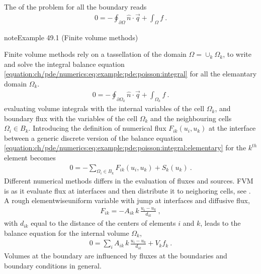 \documentclass[letterpaper,10pt,english]{jupyterBook}
\begin{document}
\sphinxAtStartPar
The  of the problem for all the boundary reads
\begin{equation}\label{equation:ch/pde/numerics:eq:example:pde:poisson:integral}
\begin{split}0 = - \oint_{\partial \Omega} \hat{n} \cdot \vec{q} + \int_{\Omega} f \ .\end{split}
\end{equation}\label{ch/pde/numerics:pde:ex:fvm}
\begin{sphinxadmonition}{note}{Example 49.1 (Finite volume methods)}



\sphinxAtStartPar
Finite volume methods rely on a tassellation of the domain \(\Omega = \cup_k \Omega_k\), to write and solve the integral balance equation \eqref{equation:ch/pde/numerics:eq:example:pde:poisson:integral} for all the elemantary domain \(\Omega_k\).
\begin{equation}\label{equation:ch/pde/numerics:eq:example:pde:poisson:integral:elementary}
\begin{split}0 = - \oint_{\partial \Omega_k} \hat{n} \cdot \vec{q} + \int_{\Omega_k} f \ .\end{split}
\end{equation}
\sphinxAtStartPar
evaluating volume integrals with the internal variables of the cell \(\Omega_k\), and boundary flux with the variables of the cell \(\Omega_k\) and the neighbouring cells \(\Omega_i \in B_k\). Introducing the definition of numerical flux \(F_{ik}(u_i, u_k)\) at the interface between a generic discrete version of the balance equation  \eqref{equation:ch/pde/numerics:eq:example:pde:poisson:integral:elementary} for the \(k^{th}\) element becomes
\begin{equation*}
\begin{split}0 = - \sum_{\Omega_i \in B_k} F_{ik}(u_i, u_k) + S_k(u_k) \ .\end{split}
\end{equation*}
\sphinxAtStartPar
Different numerical methods differs in the evaluation of fluxes and sources.
FVM is  as it evaluate flux at interfaces and then distribute it to neighoring cells, see {\hyperref[\detokenize{ch/pde/fvm:fvm:property:conservation}]{}}. A rough elementwise\sphinxhyphen{}uniform variable with jump at interfaces and diffusive flux,
\begin{equation*}
\begin{split}F_{ik} = - A_{ik} \, k \, \frac{u_i - u_k}{d_{ik}} \ ,\end{split}
\end{equation*}
\sphinxAtStartPar
with \(d_{ik}\) equal to the distance of the centers of elements \(i\) and \(k\), leads to the balance equation for the internal volume \(\Omega_k\),
\begin{equation*}
\begin{split} 0 = \sum_{i} A_{ik} \, k \, \frac{u_i-u_k}{d_{ik}} + V_k f_k \ .\end{split}
\end{equation*}
\sphinxAtStartPar
Volumes at the boundary are influenced by fluxes at the boundaries and boundary conditions in general.


\end{sphinxadmonition}
\end{document}
